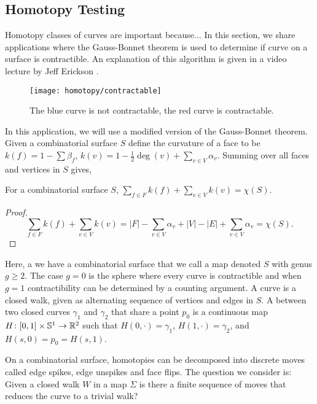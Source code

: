 \subsection{Homotopy Testing}
\label{sec:homotopy}

Homotopy classes of curves are important  because...
In this section, we share applications
where the Gauss-Bonnet theorem is used to determine
if curve on a surface is contractible.
An explanation of this algorithm is given in a video lecture 
by Jeff Erickson \cite{erickson-lecture}.

\begin{figure}[htb]
\centering
\texttt{[image: homotopy/contractable]}
\caption{The blue curve is not contractable, the red curve is contractable.}
\label{fig:contractable}
\end{figure}

In this application, we will use a modified version
of the Gauss-Bonnet theorem. Given a combinatorial surface
$S$ define the curvature of a face to be $k(f)=1-\sum \beta_f$,
$k(v)=1-\frac{1}{2}\deg(v)+\sum_{v\in V} \alpha_v$.
Summing over all faces and vertices in $S$ gives,
\begin{theorem}\label{thm:modify-g-b}
For a combinatorial surface $S$,
$\sum_{f\in F} k(f)+\sum_{v\in V}k(v)=\chi(S).$
\end{theorem}

\begin{proof}

$$\sum_{f\in F} k(f)+\sum_{v\in V}k(v)=|F|-\sum_{v\in V}\alpha_v + |V|-|E|+\sum_{v\in V}\alpha_v=\chi(S).$$
\end{proof}


Here, a we have a combinatorial surface that we call a map denoted $S$
with genus $g\geq 2.$ The case $g=0$ is the sphere where every curve
is contractible and when $g=1$ contractibility can be determined by a counting
argument.
A curve is a closed walk, given as alternating sequence of vertices
and edges in $S$.
A  between two closed curves $\gamma_1$ and $\gamma_2$ that 
share a point $p_0$ is a continuous map $H\colon [0,1]\times \mathbb{S}^1 \to \mathbb{R}^2$ 
such that $H(0,\cdot)=\gamma_1$, $H(1,\cdot)=\gamma_2$, and $H(s,0)=p_0=H(s,1)$.

On a combinatorial surface, homotopies can be decomposed
into discrete moves called edge spikes, edge unspikes  and face flips.
The question we consider is: Given a closed walk $W$ in a map $\Sigma$ is there a finite
sequence of moves that reduces the curve to a trivial walk?


